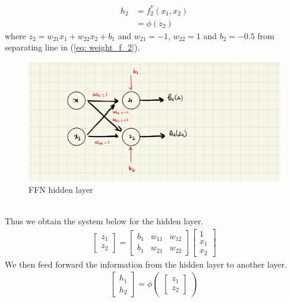 \begin{align}
  h_2 &= f_2^*(x_1,x_2) \nonumber\\
  &= \phi(z_2) \nonumber
\end{align}
where $z_2 = w_{21}x_1 + w_{22}x_2 + b_1$ and $w_{21} = -1$, $w_{22} = 1$ and $b_2 = -0.5$ from separating line in (\ref{eq: weight_f_2}).
\begin{figure}[ht]
  \centering
  \includegraphics[scale=0.15]{CHAPTER_2/c2_fig_hidden_layer.jpeg}
  \caption{FFN hidden layer}
  \label{fig:hidden_layer_only}
\end{figure} \\
Thus we obtain the system below for the hidden layer.
\begin{align}
  \begin{bmatrix}
    z_1 \\
    z_2
  \end{bmatrix} = \begin{bmatrix}
    b_1 & w_{11} & w_{12}   \\
    b_1 & w_{21} & w_{22}
  \end{bmatrix} \begin{bmatrix}
    1\\
    x_1 \\
    x_2
  \end{bmatrix}
\end{align}
We then feed forward the information from the hidden layer to another layer.
\begin{align}
  \begin{bmatrix}
    h_1 \\
    h_2
  \end{bmatrix} = \phi\begin{pmatrix}
    \begin{bmatrix}
      z_1 \\
      z_2
    \end{bmatrix}
  \end{pmatrix}
\end{align}
